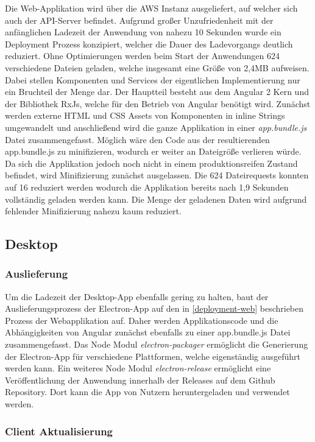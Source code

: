 Die Web-Applikation wird über die \ac{AWS} Instanz ausgeliefert, auf welcher sich auch der \ac{API}-Server befindet.
Aufgrund großer Unzufriedenheit mit der anfänglichen Ladezeit der Anwendung von nahezu 10 Sekunden wurde ein Deployment
Prozess konzipiert, welcher die Dauer des Ladevorgangs deutlich reduziert.
Ohne Optimierungen werden beim Start der Anwendungen 624 verschiedene Dateien geladen,
welche insgesamt eine Größe von 2,4MB aufweisen.
Dabei stellen Komponenten und Services der eigentlichen Implementierung nur ein Bruchteil der Menge dar.
Der Hauptteil besteht aus dem Angular 2 Kern und der Bibliothek RxJs, welche für den Betrieb von Angular benötigt wird.
Zunächst werden externe \ac{HTML} und \ac{CSS} Assets von Komponenten in
inline Strings umgewandelt und anschließend wird die ganze Applikation in einer \emph{app.bundle.js} Datei zusammengefasst.
Möglich wäre den Code aus der resultierenden app.bundle.js zu minifizieren,
wodurch er weiter an Dateigröße verlieren würde. Da sich die Applikation \projectname{}
jedoch noch nicht in einem produktionsreifen Zustand befindet, wird Minifizierung zunächst ausgelassen.
Die 624 Dateirequests konnten auf 16 reduziert werden wodurch die Applikation bereits nach 1,9
Sekunden vollständig geladen werden kann.
Die Menge der geladenen Daten wird aufgrund fehlender Minifizierung nahezu kaum reduziert.

\subsection{Desktop}

\subsubsection{Auslieferung}
Um die Ladezeit der Desktop-App ebenfalls gering zu halten, baut der Auslieferungsprozess der Electron-App
auf den in \ref{deployment-web} beschrieben Prozess der Webapplikation auf. Daher werden Applikationscode und die
Abhängigkeiten von Angular zunächst ebenfalls zu einer app.bundle.js Datei zusammengefasst.
Das Node Modul \emph{electron-packager} ermöglicht die Generierung der Electron-App für verschiedene Plattformen,
welche eigenständig ausgeführt werden kann.
Ein weiteres Node Modul \emph{electron-release} ermöglicht eine Veröffentlichung
der Anwendung innerhalb der Releases auf dem Github Repository.
Dort kann die App von Nutzern heruntergeladen und verwendet werden.

\subsubsection{Client Aktualisierung}
\label{client-updates}

